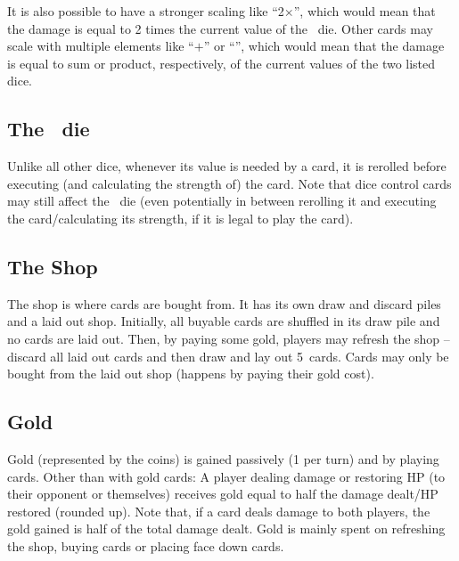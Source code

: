 \documentclass[dvipsnames,parskip,a4paper]{scrartcl}
\newcommand{\iconsize}{3.4mm}
\newcommand{\icondepth}{0.45mm}
\newcommand{\icon}[1]{\raisebox{-\icondepth}{\texttt{[image:  \#1 ]}}}
\newcommand{\fire}{\icon{icons/fire.png}}
\newcommand{\earth}{\icon{icons/earth.png}}
\newcommand{\water}{\icon{icons/water.png}}
\newcommand{\magic}{\icon{icons/magic.png}}
\newcommand{\chance}{\icon{icons/chance.png}}
\newcommand{\shopsize}{5}
\begin{document}
\vspace{4pt}

It is also possible to have a stronger scaling like ``2\hspace{1pt}$\times$\hspace{1pt}\fire'', which would mean that the damage is equal to 2 times the current value of the \fire \ die. Other cards may scale with multiple elements like ``\earth\hspace{1pt}$+$\hspace{1pt}\chance'' or ``\water\hspace{1pt}\times\hspace{1pt}\magic'', which would mean that the damage is equal to sum or product, respectively, of the current values of the two listed dice.

\vspace{4pt}

\subsection*{The \chance \ die}

Unlike all other dice, whenever its value is needed by a card, it is rerolled before executing (and calculating the strength of) the card. Note that dice control cards may still affect the \chance \ die (even potentially in between rerolling it and executing the card/calculating its strength, if it is legal to play the card).

\subsection*{The Shop}

The shop is where cards are bought from. It has its own draw and discard piles and a laid out shop. Initially, all buyable cards are shuffled in its draw pile and no cards are laid out. Then, by paying some gold, players may refresh the shop -- discard all laid out cards and then draw and lay out \shopsize \ cards. Cards may only be bought from the laid out shop (happens by paying their gold cost).

\subsection*{Gold}

Gold (represented by the coins) is gained passively (1 per turn) and by playing cards. Other than with gold cards: A player dealing damage or restoring HP (to their opponent or themselves) receives gold equal to half the damage dealt/HP restored (rounded up). Note that, if a card deals damage to both players, the gold gained is half of the total damage dealt. Gold is mainly spent on refreshing the shop, buying cards or placing face down cards.
\end{document}
